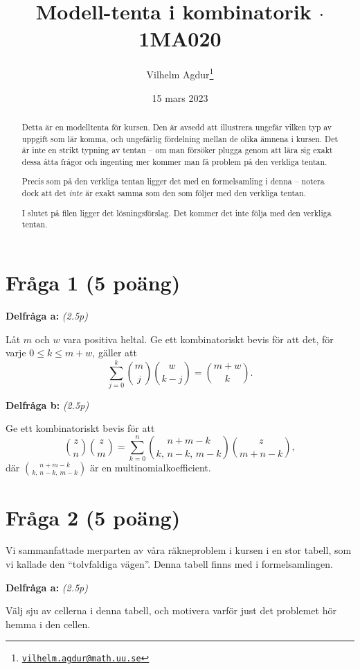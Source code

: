 \documentclass[nobib]{tufte-handout}
\title{Modell-tenta i kombinatorik $\cdot$ 1MA020}
\author[Vilhelm Agdur]{Vilhelm Agdur\thanks{
\href{mailto:vilhelm.agdur@math.uu.se}{\nolinkurl{vilhelm.agdur@math.uu.se}}}}
\date{15 mars 2023}
\begin{document}

\maketitle%

\begin{abstract}
\noindent
Detta är en modelltenta för kursen. Den är avsedd att illustrera ungefär vilken typ av uppgift som lär komma, och ungefärlig fördelning mellan de olika ämnena i kursen. Det är inte en strikt typning av tentan -- om man försöker plugga genom att lära sig exakt dessa åtta frågor och ingenting mer kommer man få problem på den verkliga tentan.

Precis som på den verkliga tentan ligger det med en formelsamling i denna -- notera dock att det \emph{inte} är exakt samma som den som följer med den verkliga tentan.

I slutet på filen ligger det lösningsförslag. Det kommer det inte följa med den verkliga tentan.
\end{abstract}

\section{Fråga 1 (5 poäng)} %
\textbf{Delfråga a:} \emph{(2.5p)}

Låt $m$ och $w$ vara positiva heltal. Ge ett kombinatoriskt bevis för att det, för varje $0 \leq k \leq m + w$, gäller att
$$\sum_{j=0}^k \binom{m}{j}\binom{w}{k-j} = \binom{m + w}{k}.$$

\noindent\textbf{Delfråga b:} \emph{(2.5p)}

Ge ett kombinatoriskt bevis för att
$$\binom{z}{n}\binom{z}{m} = \sum_{k=0}^{n} \binom{n + m - k}{k,\,n-k,\,m-k}\binom{z}{m + n -k},$$
där $\binom{n + m - k}{k,\,n-k,\,m-k}$ är en multinomialkoefficient.

\section{Fråga 2 (5 poäng)} %

Vi sammanfattade merparten av våra räkneproblem i kursen i en stor tabell, som vi kallade den ``tolvfaldiga vägen''. Denna tabell finns med i formelsamlingen.

\noindent\textbf{Delfråga a:} \emph{(2.5p)}

Välj sju av cellerna i denna tabell, och motivera varför just det problemet hör hemma i den cellen.
\end{document}
